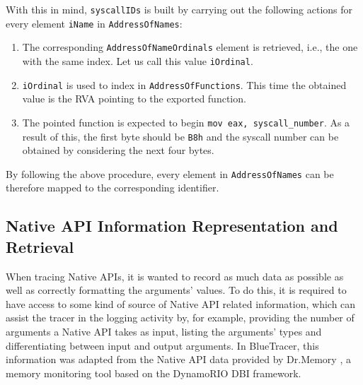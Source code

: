With this in mind, \texttt{syscallIDs} is built by carrying out the following actions for every element \texttt{iName} in \texttt{AddressOfNames}:

\begin{enumerate}
\item The corresponding \texttt{AddressOfNameOrdinals} element is retrieved, i.e., the one with the same index. Let us call this value \texttt{iOrdinal}.
\item \texttt{iOrdinal} is used to index in \texttt{AddressOfFunctions}. This time the obtained value is the RVA pointing to the exported function.
\item The pointed function is expected to begin \texttt{mov eax, syscall\_number}. As a result of this, the first byte should be \texttt{B8h} and the syscall number can be obtained by considering the next four bytes.  
\end{enumerate}

By following the above procedure, every element in \texttt{AddressOfNames} can be therefore mapped to the corresponding identifier. 

\subsection{Native API Information Representation and Retrieval}

When tracing Native APIs, it is wanted to record as much data as possible as well as correctly formatting the arguments' values. To do this, it is required to have access to some kind of source of Native API related information, which can assist the tracer in the logging activity by, for example, providing the number of arguments a Native API takes as input, listing the arguments' types and differentiating between input and output arguments.
In BlueTracer, this information was adapted from the Native API data provided by Dr.Memory \cite{DrMemory}, a memory monitoring tool based on the DynamoRIO DBI framework.

